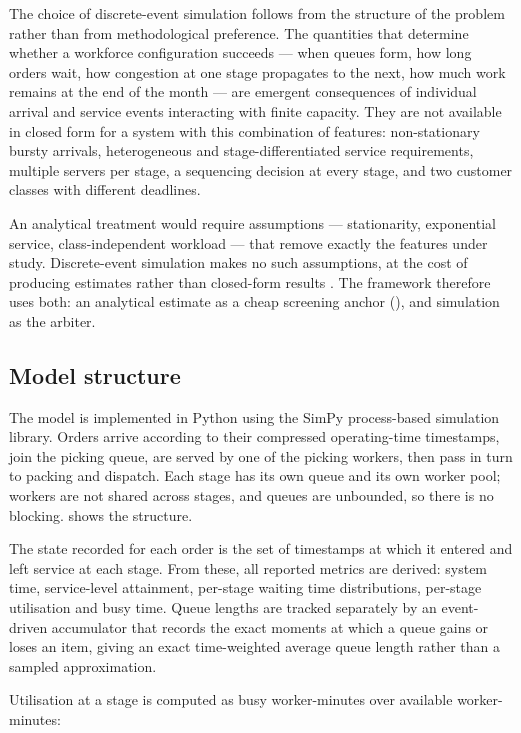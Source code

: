 The choice of discrete-event simulation follows from the structure of the problem rather than
from methodological preference. The quantities that determine whether a workforce configuration
succeeds --- when queues form, how long orders wait, how congestion at one stage propagates to
the next, how much work remains at the end of the month --- are emergent consequences of
individual arrival and service events interacting with finite capacity. They are not available
in closed form for a system with this combination of features: non-stationary bursty arrivals,
heterogeneous and stage-differentiated service requirements, multiple servers per stage, a
sequencing decision at every stage, and two customer classes with different deadlines.

An analytical treatment would require assumptions --- stationarity, exponential service,
class-independent workload --- that remove exactly the features under study. Discrete-event
simulation makes no such assumptions, at the cost of producing estimates rather than closed-form
results \citep{law2015}. The framework therefore uses both: an analytical estimate as a cheap
screening anchor (), and simulation as the arbiter.

\subsection{Model structure}

The model is implemented in Python using the SimPy process-based simulation library. Orders
arrive according to their compressed operating-time timestamps, join the picking queue, are
served by one of the picking workers, then pass in turn to packing and dispatch. Each stage has
its own queue and its own worker pool; workers are not shared across stages, and queues are
unbounded, so there is no blocking.  shows the structure.

The state recorded for each order is the set of timestamps at which it entered and left service
at each stage. From these, all reported metrics are derived: system time, service-level
attainment, per-stage waiting time distributions, per-stage utilisation and busy time. Queue
lengths are tracked separately by an event-driven accumulator that records the exact moments at
which a queue gains or loses an item, giving an exact time-weighted average queue length rather
than a sampled approximation.

Utilisation at a stage is computed as busy worker-minutes over available worker-minutes:

